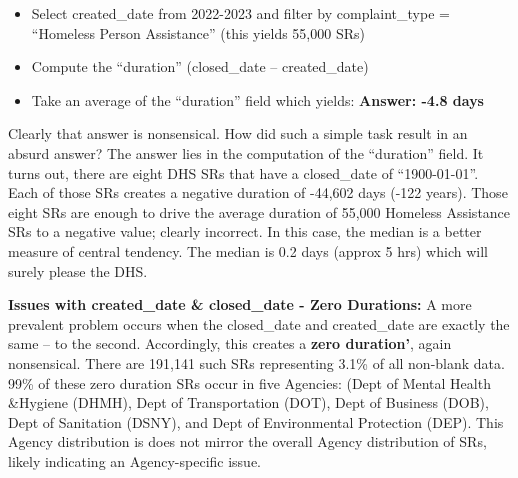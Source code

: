 \documentclass[12pt, titlepage]{article}
\begin{document}
		
\begin{itemize}
    \item Select created\_date from 2022-2023 and filter by complaint\_type = 
    ``Homeless Person Assistance'' (this yields 55,000 SRs)
    
    \item Compute the ``duration'' (closed\_date – created\_date)
    
    \item Take an average of the ``duration'' field  which yields: \textbf{Answer:  -4.8 days}  
\end{itemize}

		
Clearly that answer is nonsensical. How did such a simple task result 
in an absurd answer? The answer lies in the computation of the ``duration'' 
field. It turns out, there are eight DHS SRs that have a closed\_date 
of ``1900-01-01''. Each of those SRs creates a negative duration of -44,602 
days (-122 years). Those eight SRs are enough to drive the 
average duration of 55,000 Homeless Assistance SRs to a negative 
value; clearly incorrect. In this case, the median is a better measure 
of central tendency. The median is  0.2 days (approx 5 hrs) which will
surely please the DHS. 

		
	
		
\label{sec: zeroduration}		
\textbf{Issues with created\_date \& closed\_date - Zero Durations:} A more 
prevalent problem occurs when the closed\_date and created\_date 
are exactly the same -- to the second. Accordingly, this creates 
a \textbf{zero duration'}, again nonsensical. There are 191,141 
such SRs representing 3.1\% of all non-blank data. 99\% of these zero duration 
SRs occur in five Agencies:  (Dept of Mental Health \&Hygiene (DHMH), Dept 
of Transportation (DOT), Dept of Business (DOB), Dept of Sanitation 
(DSNY), and Dept of Environmental Protection (DEP). This Agency distribution
is does not mirror the overall Agency distribution of SRs, likely indicating an 
Agency-specific issue.
	
		
\end{document}
